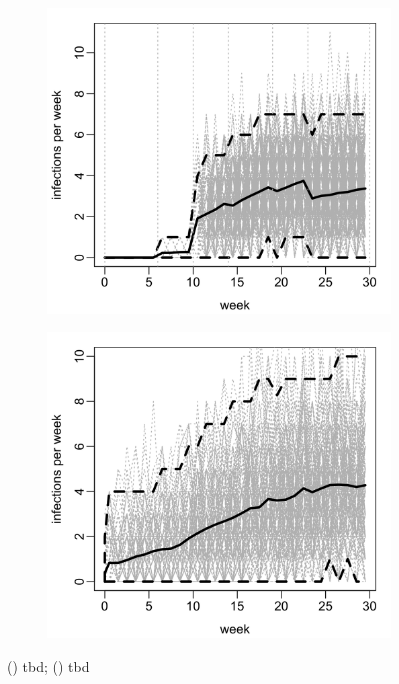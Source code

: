 \documentclass{uwstat572}
\begin{document}
\begin{figure}[H]
	\centering
	\begin{subfigure}[b]{0.49\textwidth}
		\includegraphics[width=\textwidth]{figures/figure_4a.png}
		\caption{}
		\label{fig:cond_infections}
	\end{subfigure}
	\hfill
	\begin{subfigure}[b]{0.49\textwidth}
		\includegraphics[width=\textwidth]{figures/figure_4b.png}
		\caption{}
		\label{fig:sim_infection}
	\end{subfigure}
	\caption{() tbd; () tbd }
	\label{fig:data_plot}
\end{figure} 
\end{document}
